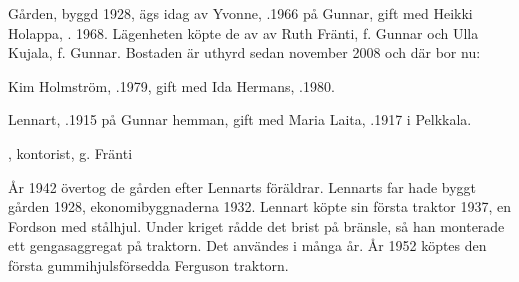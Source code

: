 


Gården, byggd 1928, ägs idag av Yvonne, .1966 på Gunnar, gift med Heikki Holappa, . 1968. Lägenheten köpte de av av Ruth Fränti, f. Gunnar och Ulla Kujala, f. Gunnar. Bostaden är uthyrd sedan november 2008 och där bor nu:

Kim Holmström, .1979, gift med Ida Hermans, .1980.
\begin{jhchildren}
  \item {}
  \item {}
  \item {}
\end{jhchildren}


Lennart, .1915 på Gunnar hemman, gift med Maria Laita, .1917 i Pelkkala.
\begin{jhchildren}
  \item {}
  \item {}
  \item {}
  \item {}, kontorist, g. Fränti
  \item {}
  \item {}
\end{jhchildren}


År 1942 övertog de gården efter Lennarts föräldrar. Lennarts far hade byggt gården 1928, ekonomibyggnaderna 1932. Lennart köpte sin första traktor 1937, en Fordson med stålhjul. Under kriget rådde det brist på bränsle, så han monterade ett gengasaggregat på traktorn. Det användes i många år. År 1952 köptes den första gummihjulsförsedda Ferguson traktorn.

